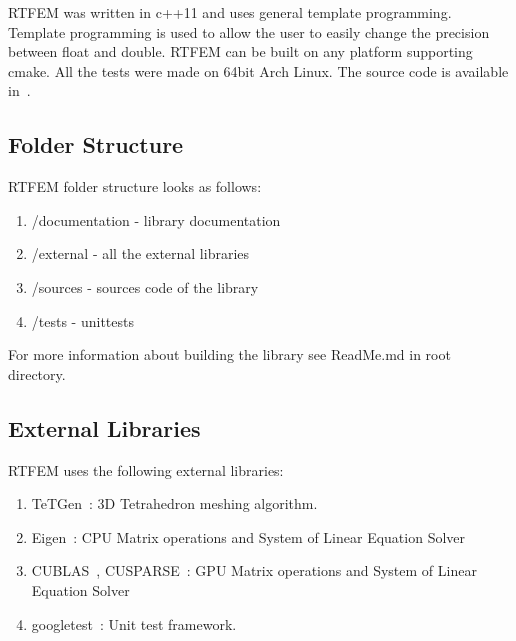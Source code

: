 \documentclass[en]{minipw} %
\begin{document}
RTFEM was written in c++11 and uses general template programming. Template programming is used to allow the user to easily change the precision between float and double. RTFEM can be built on any platform supporting cmake. All the tests were made on 64bit Arch Linux. The source code is available in~\cite{rtfem}.

\subsection{Folder Structure}
RTFEM folder structure looks as follows:
\begin{enumerate}
\item /documentation - library documentation
\item /external - all the external libraries
\item /sources - sources code of the library
\item /tests - unittests
\end{enumerate}
For more information about building the library see ReadMe.md in root directory.

\subsection{External Libraries}
RTFEM uses the following external libraries:
\begin{enumerate}
\item TeTGen~\cite{tetgen}: 3D Tetrahedron meshing algorithm.
\item Eigen~\cite{eigen}: CPU Matrix operations and System of Linear Equation Solver
\item CUBLAS~\cite{cublas}, CUSPARSE~\cite{cusparse}: GPU Matrix operations and System of Linear Equation Solver
\item googletest~\cite{googletest}: Unit test framework.
\end{enumerate}
\end{document}
